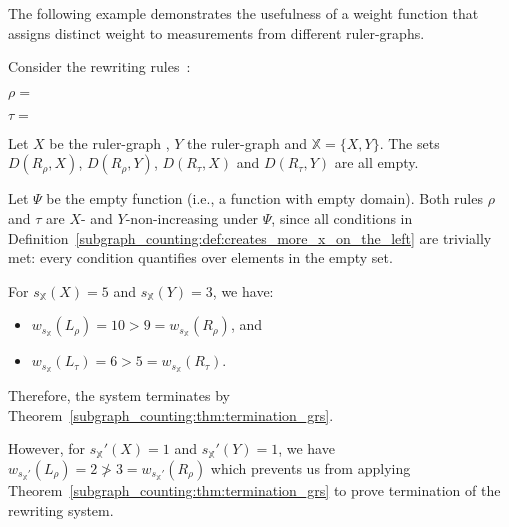 The following example demonstrates the usefulness of a weight function that assigns distinct weight to measurements from different ruler-graphs.
\begin{example} 
    \label{ex:overbeek_5d6}
    Consider the rewriting rules~\cite[Example 5.6]{overbeek2024termination_lmcs}:
    \begin{center}
        \begin{center} 
          $\rho\mathop{=}$
        \end{center}
        \begin{center}
        $\tau\mathop{=}$
        \end{center}
      \end{center}
     Let $X$ be the ruler-graph
    , $Y$ the ruler-graph 
     and $\mathbb{X}\mathop{=}\{X, Y\}$.
    The sets $D(R_\rho, X)$, $D(R_\rho, Y)$, $D(R_\tau, X)$ and $D(R_\tau, Y)$ are all empty. 
    
    Let $\Psi$ be the empty function (i.e., a function with empty domain).
    Both rules $\rho$ and $\tau$ are $X$- and $Y$-non-increasing under $\Psi$,
    since all conditions in Definition~\ref{subgraph_counting:def:creates_more_x_on_the_left} are trivially met: every condition quantifies over elements in the empty set.
    
    For $s_\mathbb{X}(X)\mathop{=}5$ and $s_\mathbb{X}(Y)\mathop{=}3$, we have:
    \begin{itemize}
       \item $w_{s_\mathbb{X}}(L_\rho)\mathop{=}10\mathop{>}9\mathop{=}w_{s_\mathbb{X}}(R_\rho)$, and
       \item $w_{s_\mathbb{X}}(L_\tau)\mathop{=}6\mathop{>}5\mathop{=}w_{s_\mathbb{X}}(R_\tau)$.
    \end{itemize}
    Therefore, the system terminates by Theorem~\ref{subgraph_counting:thm:termination_grs}.

  However, for $s_\mathbb{X}'(X)\mathop{=}1$ and $s_\mathbb{X}'(Y)\mathop{=}1$, we have
    \(
        w_{s_\mathbb{X}'}(L_\rho)\mathop{=}2   \ngtr 3\mathop{=}w_{s_\mathbb{X}'}(R_\rho)
    \) which prevents us from applying Theorem~\ref{subgraph_counting:thm:termination_grs} to prove termination of the rewriting system.
\end{example}

